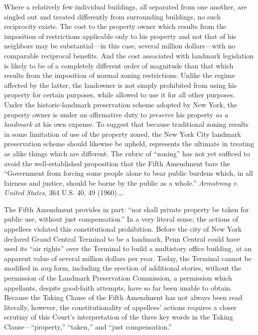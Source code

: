 Where a relatively few individual buildings, all separated from one another, are
singled out and treated differently from surrounding buildings, no such
reciprocity exists. The cost to the property owner which results from the
imposition of restrictions applicable only to his property and not that of his
neighbors may be substantial---in this case, several million dollars---with no
comparable reciprocal benefits. And the cost associated with landmark
legislation is likely to be of a completely different order of magnitude than
that which results from the imposition of normal zoning restrictions. Unlike the
regime affected by the latter, the landowner is not simply prohibited from using
his property for certain purposes, while allowed to use it for all other
purposes. Under the historic-landmark preservation scheme adopted by New York,
the property owner is under an affirmative duty to \textit{preserve} his
property \textit{as a landmark} at his own expense. To suggest that because
traditional zoning results in some limitation of use of the property zoned, the
New York City landmark preservation scheme should likewise be upheld, represents
the ultimate in treating as alike things which are different. The rubric of
``zoning'' has not yet sufficed to avoid the well-established proposition that
the Fifth Amendment bars the ``Government from forcing some people alone to bear
public burdens which, in all fairness and justice, should be borne by the public
as a whole.'' \textit{Armstrong v. United States}, 364 U.S. 40, 49 (1960).\ldots



The Fifth Amendment provides in part: ``nor shall private property be taken for
public use, without just compensation.'' In a very literal sense, the actions of
appellees violated this constitutional prohibition. Before the city of New York
declared Grand Central Terminal to be a landmark, Penn Central could have used
its ``air rights'' over the Terminal to build a multistory office building, at
an apparent value of several million dollars per year. Today, the Terminal
cannot be modified in \textit{any} form, including the erection of additional
stories, without the permission of the Landmark Preservation Commission, a
permission which appellants, despite good-faith attempts, have so far been
unable to obtain. Because the Taking Clause of the Fifth Amendment has not
always been read literally, however, the constitutionality of appellees' actions
requires a closer scrutiny of this Court's interpretation of the three key words
in the Taking Clause---``property,'' ``taken,'' and ``just compensation.''


